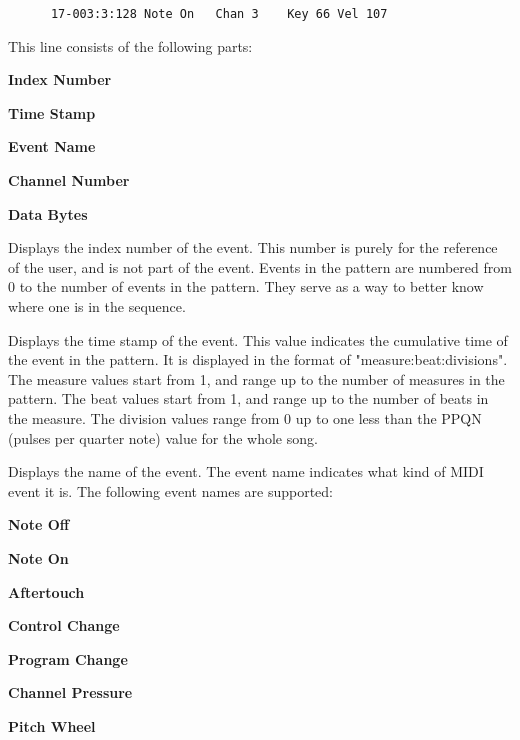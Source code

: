    \begin{verbatim}
      17-003:3:128 Note On   Chan 3    Key 66 Vel 107
   \end{verbatim}

   This line consists of the following parts:

   \begin{enumber}
      \item \textbf{Index Number}
      \item \textbf{Time Stamp}
      \item \textbf{Event Name}
      \item \textbf{Channel Number}
      \item \textbf{Data Bytes}
   \end{enumber}

   \setcounter{ItemCounter}{0}      %

   Displays the index number of the event.
   This number is purely for the reference of the user, and is not part
   of the event.  Events in the pattern are numbered from 0 to the number of
   events in the pattern.  They serve as a way to better know where one is in
   the sequence.

   Displays the time stamp of the event.
   This value indicates the cumulative time of the event in the pattern.
   It is displayed in the format of "measure:beat:divisions".
   The measure values start from 1, and range up to the number of measures in
   the pattern.
   The beat values start from 1, and range up to the number of beats in the
   measure.
   The division values range from 0 up to one less than the
   PPQN (pulses per quarter note) value for the whole song.

   Displays the name of the event.
   The event name indicates what kind of MIDI event it is. 
   The following event names are supported:

   \begin{enumber}
      \item \textbf{Note Off}
      \item \textbf{Note On}
      \item \textbf{Aftertouch}
      \item \textbf{Control Change}
      \item \textbf{Program Change}
      \item \textbf{Channel Pressure}
      \item \textbf{Pitch Wheel}
   \end{enumber}

